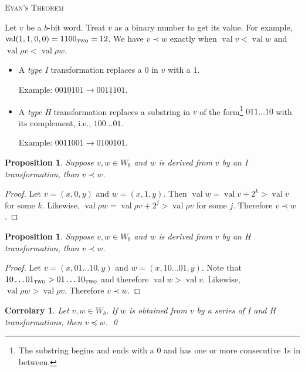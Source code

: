 \documentclass[12pt]{article}
\DeclareMathOperator{\val}{val}
\newcommand{\two}{\textsc{two}}
\newcommand{\rhov}{\rho v}
\newcommand{\rhow}{\rho w}
\newtheorem{corr}[conj]{Corrolary}
\newtheorem{prop}[conj]{Proposition}
\begin{document}
\begin{center}
  \textsc{\large
    Evan's Theorem
  }
\end{center}

Let $v$ be a $b$-bit word. Treat $v$ as a binary number to get its
value. For example, $\val (1,1,0,0) = 1100_\two = 12$. We have $v\prec
w$ exactly when $\val v < \val w$ and $\val \rhov < \val \rhow$.


\begin{itemize}
\item A \emph{type I} transformation replaces a $0$ in $v$ with a $1$.

  Example: $001\underline0 101 \to 001 \underline1 101$. 

\item A \emph{type H} transformation replaces a substring in $v$ of
  the form\footnote{The substring begins and ends with a $0$ and has
    one or more consecutive $1$s in between.}  $011\dots10$ with its
  complement, i.e., $100\ldots01$.

  Example: $0\underline{0110}01 \to 0 \underline{1001} 01$.
\end{itemize}


\begin{prop}
  Suppose $v,w\in W_b$ and $w$ is derived from $v$ by an I
  transformation, than $v \prec w$.
\end{prop}


\begin{proof}
  Let $v=(x,0,y)$ and $w=(x,1,y)$. Then $\val w = \val v + 2^k > \val
  v$ for some $k$. Likewise, $\val\rho w = \val\rho v + 2^j > \val\rho
  v$ for some $j$. Therefore $v \prec w$.
\end{proof}

\begin{prop}
  Suppose $v,w\in W_b$ and $w$ is derived from $v$ by an H
  transformation, than $v \prec w$.
\end{prop}

\begin{proof}
  Let $v = (x,01\ldots10,y)$ and $w=(x,10\ldots01,y)$. Note that
  $10\ldots01_\textsc{two} >01\ldots10_\two$ and therefore $\val w
  >\val v$. Likewise, $\val \rho w > \val \rho v$. Therefore $v \prec
  w$.  
\end{proof}


\begin{corr}
  Let $v,w \in W_b$. If $w$ is obtained from $v$ by a series of I and
  H transformations, then $v\preceq w$. \qed
\end{corr}
\end{document}
